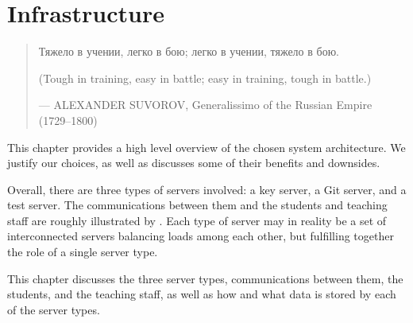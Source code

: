 
\chapter{Infrastructure}

\begin{quotation}

\footnotesize\sffamily\itshape

\begin{flushright}


Тяжело в учении, легко в бою; легко в учении, тяжело в бою.


\smallbreak

(Tough in training, easy in battle; easy in training, tough in battle.)

\smallbreak

\upshape

--- ALEXANDER SUVOROV, Generalissimo of the Russian Empire (1729--1800)

\end{flushright}

\end{quotation}

This chapter provides a high level overview of the chosen system architecture.
We justify our choices, as well as discusses some of their benefits and
downsides.

Overall, there are three types of servers involved: a key server, a Git server,
and a test server. The communications between them and the students and
teaching staff are roughly illustrated by . Each
type of server may in reality be a set of interconnected servers balancing
loads among each other, but fulfilling together the role of a single server
type.

This chapter discusses the three server types, communications between them, the
students, and the teaching staff, as well as how and what data is stored by
each of the server types.









